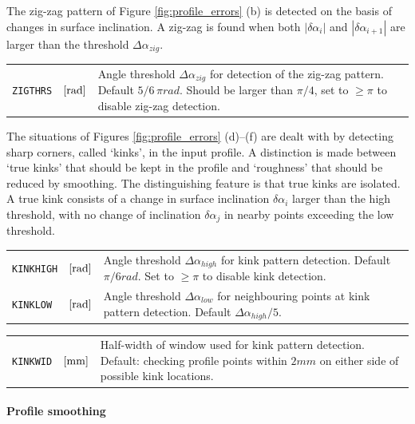 \documentclass[12pt]{report}
\newenvironment{inputvars}{\vspace{0.4\baselineskip}%

\begin{tabular}{>{\raggedright}p{22mm}p{19mm}p{113mm}}}{
\end{tabular}

}
\newcommand{\inpvar}[3]{{\small\tt #1} & $#2$ & #3 \\[1ex]}
\newcommand{\inpbreak}{\end{inputvars}\begin{inputvars}}
\begin{document}
The zig-zag pattern of Figure \ref{fig:profile_errors} (b) is detected on
the basis of changes in surface inclination. A zig-zag is found when both
$|\delta\alpha_i|$ and $|\delta\alpha_{i+1}|$ are larger than the threshold
$\Delta\alpha_{zig}$. 
\begin{inputvars}
\inpvar{ZIGTHRS}{\bunit{rad}}{Angle threshold $\Delta\alpha_{zig}$ for
        detection of the zig-zag pattern. Default $5/6\,\pi\unit{rad}$.
        Should be larger than $\pi/4$, set to $\ge\pi$ to disable zig-zag
        detection.}
\end{inputvars}
The situations of Figures \ref{fig:profile_errors} (d)--(f) are dealt with
by detecting sharp corners, called `kinks', in the input profile. A
distinction is made between `true kinks' that should be kept in the profile
and `roughness' that should be reduced by smoothing. The distinguishing
feature is that true kinks are isolated. A true kink consists of a change
in surface inclination $\delta\alpha_i$ larger than the high threshold,
with no change of inclination $\delta\alpha_j$ in nearby points exceeding
the low threshold. 
\begin{inputvars}
\inpvar{KINKHIGH}{\bunit{rad}}{Angle threshold $\Delta\alpha_{high}$ for
        kink pattern detection. Default $\pi/6\unit{rad}$. Set to $\ge\pi$
        to disable kink detection.}
\inpvar{KINKLOW}{\bunit{rad}}{Angle threshold $\Delta\alpha_{low}$ for
        neighbouring points at kink pattern detection. Default
        $\Delta\alpha_{high}/5$.}
\inpbreak
\inpvar{KINKWID}{\bunit{mm}}{Half-width of window used for kink pattern
        detection. Default: checking profile points within $2\unit{mm}$ on
        either side of possible kink locations.}
\end{inputvars}

\paragraph{Profile smoothing}
\end{document}
